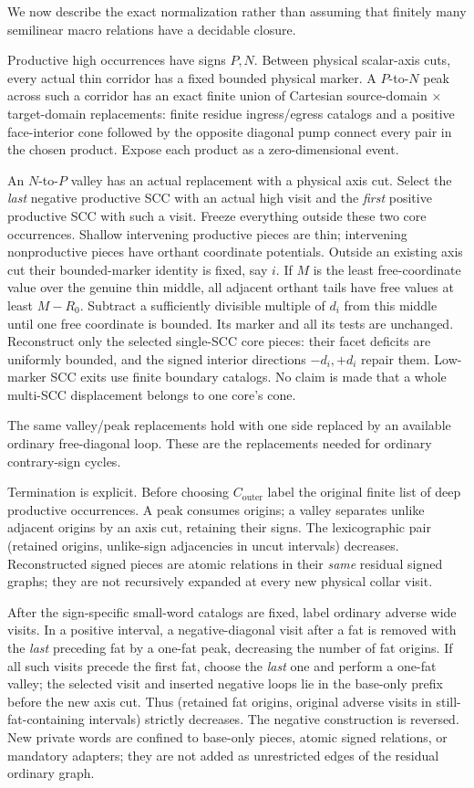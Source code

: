 \documentclass[11pt,a4paper]{article}
\theoremstyle{remark}
\newcommand{\Co}{C_{\mathrm{outer}}}
\begin{document}
We now describe the exact normalization rather than assuming that finitely many semilinear macro relations have a decidable closure.

Productive high occurrences have signs \(P,N\). Between physical scalar-axis cuts, every actual thin corridor has a fixed bounded physical marker. A \(P\)-to-\(N\) peak across such a corridor has an exact finite union of Cartesian source-domain \(\times\) target-domain replacements: finite residue ingress/egress catalogs and a positive face-interior cone followed by the opposite diagonal pump connect every pair in the chosen product. Expose each product as a zero-dimensional event.

An \(N\)-to-\(P\) valley has an actual replacement with a physical axis cut. Select the \emph{last} negative productive SCC with an actual high visit and the \emph{first} positive productive SCC with such a visit. Freeze everything outside these two core occurrences. Shallow intervening productive pieces are thin; intervening nonproductive pieces have orthant coordinate potentials. Outside an existing axis cut their bounded-marker identity is fixed, say \(i\). If \(M\) is the least free-coordinate value over the genuine thin middle, all adjacent orthant tails have free values at least \(M-R_0\). Subtract a sufficiently divisible multiple of \(d_i\) from this middle until one free coordinate is bounded. Its marker and all its tests are unchanged. Reconstruct only the selected single-SCC core pieces: their facet deficits are uniformly bounded, and the signed interior directions \(-d_i,+d_i\) repair them. Low-marker SCC exits use finite boundary catalogs. No claim is made that a whole multi-SCC displacement belongs to one core's cone.

The same valley/peak replacements hold with one side replaced by an available ordinary free-diagonal loop. These are the replacements needed for ordinary contrary-sign cycles.

Termination is explicit. Before choosing \(\Co\) label the original finite list of deep productive occurrences. A peak consumes origins; a valley separates unlike adjacent origins by an axis cut, retaining their signs. The lexicographic pair (retained origins, unlike-sign adjacencies in uncut intervals) decreases. Reconstructed signed pieces are atomic relations in their \emph{same} residual signed graphs; they are not recursively expanded at every new physical collar visit.

After the sign-specific small-word catalogs are fixed, label ordinary adverse wide visits. In a positive interval, a negative-diagonal visit after a fat is removed with the \emph{last} preceding fat by a one-fat peak, decreasing the number of fat origins. If all such visits precede the first fat, choose the \emph{last} one and perform a one-fat valley; the selected visit and inserted negative loops lie in the base-only prefix before the new axis cut. Thus (retained fat origins, original adverse visits in still-fat-containing intervals) strictly decreases. The negative construction is reversed. New private words are confined to base-only pieces, atomic signed relations, or mandatory adapters; they are not added as unrestricted edges of the residual ordinary graph.
\end{document}

